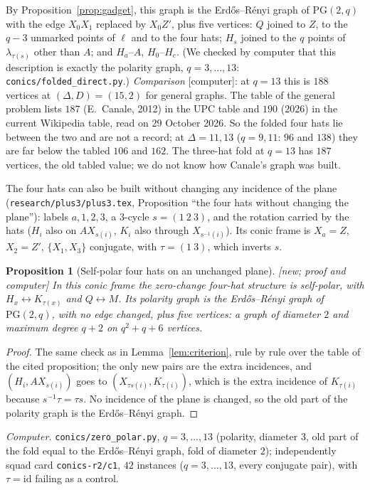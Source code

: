 \documentclass[11pt]{amsart}
\newtheorem{proposition}[theorem]{Proposition}
\theoremstyle{definition}
\theoremstyle{remark}
\newcommand{\lam}{\lambda}
\newcommand{\PG}{\mathrm{PG}}
\newcommand{\status}[1]{\textup{[#1]}}
\begin{document}
By Proposition~\ref{prop:gadget}, this graph is the Erd\H{o}s--R\'enyi graph of $\PG(2,q)$ with the edge $X_0X_1$
replaced by $X_0Z'$, plus five vertices: $Q$ joined to $Z$, to the $q-3$ unmarked points of $\ell$ and to the four
hats; $H_s$ joined to the $q$ points of $\lam_{\tau(s)}$ other than $A$; and $H_a$--$A$, $H_0$--$H_c$. (We checked by computer that this
description is exactly the polarity graph, $q=3,\dots,13$: \texttt{conics/folded\_direct.py}.)
\emph{Comparison} \status{computer}: at $q=13$ this is $188$ vertices at $(\Delta,D)=(15,2)$ for general graphs. The
table of the general problem lists $187$ (E.~Canale, 2012) in the UPC table and $190$ (2026) in the current
Wikipedia table, read on 29 October 2026. So the folded four hats lie between the two and are not a record; at
$\Delta=11,13$ ($q=9,11$: $96$ and $138$) they are far below the tabled $106$ and $162$. The three-hat fold at $q=13$
has $187$ vertices, the old tabled value; we do not know how Canale's graph was built.

The four hats can also be built without changing any incidence of the plane (\texttt{research/plus3/plus3.tex},
Proposition ``the four hats without changing the plane''): labels $a,1,2,3$, a $3$-cycle $s=(1\ 2\ 3)$, and the
rotation carried by the hats ($H_i$ also on $AX_{s(i)}$, $K_i$ also through $X_{s^{-1}(i)}$). Its conic frame is
$X_a=Z$, $X_2=Z'$, $\{X_1,X_3\}$ conjugate, with $\tau=(1\ 3)$, which inverts $s$.

\begin{proposition}[Self-polar four hats on an unchanged plane]\label{prop:zero}
\status{new; proof and computer} In this conic frame the zero-change four-hat structure is self-polar, with
$H_x\leftrightarrow K_{\tau(x)}$ and $Q\leftrightarrow M$. Its polarity graph is the Erd\H{o}s--R\'enyi graph of
$\PG(2,q)$, with \emph{no edge changed}, plus five vertices: a graph of diameter $2$ and maximum degree $q+2$ on
$q^2+q+6$ vertices.
\end{proposition}
\begin{proof}
The same check as in Lemma~\ref{lem:criterion}, rule by rule over the table of the cited proposition; the only new
pairs are the extra incidences, and $(H_i,AX_{s(i)})$ goes to $(X_{\tau s(i)},K_{\tau(i)})$, which is the extra
incidence of $K_{\tau(i)}$ because $s^{-1}\tau=\tau s$. No incidence of the plane is changed, so the old part of the
polarity graph is the Erd\H{o}s--R\'enyi graph.
\end{proof}
\emph{Computer.} \texttt{conics/zero\_polar.py}, $q=3,\dots,13$ (polarity, diameter $3$, old part of the fold equal
to the Erd\H{o}s--R\'enyi graph, fold of diameter $2$); independently squad card \texttt{conics-r2/c1}, $42$
instances ($q=3,\dots,13$, every conjugate pair), with $\tau=\mathrm{id}$ failing as a control.
\end{document}
